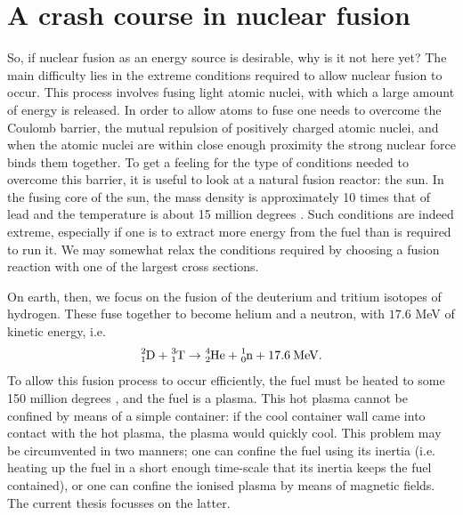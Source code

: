 \vspace*{-2mm}
\section{A crash course in nuclear fusion}
\label{sec: chap1 motivation}

So, if nuclear fusion as an energy source is desirable, why is it not here yet? The main difficulty lies in the extreme conditions required to allow nuclear fusion to occur. This process involves fusing light atomic nuclei, with which a large amount of energy is released. In order to allow atoms to fuse one needs to overcome the Coulomb barrier, the mutual repulsion of positively charged atomic nuclei, and when the atomic nuclei are within close enough proximity the strong nuclear force binds them together. To get a feeling for the type of conditions needed to overcome this barrier, it is useful to look at a natural fusion reactor: the sun. In the fusing core of the sun, the mass density is approximately 10 times that of lead and the temperature is about 15 million degrees \textcelsius. Such conditions are indeed extreme, especially if one is to extract more energy from the fuel than is required to run it. We may somewhat relax the conditions required by choosing a fusion reaction with one of the largest cross sections. \par 

On earth, then, we focus on the fusion of the deuterium and tritium isotopes of hydrogen. These fuse together to become helium and a neutron, with $17.6$ MeV of kinetic energy, i.e.
\begin{equation*}
    \ce{^{2}_{1} D} + \ce{^{3}_{1} T} \rightarrow \ce{^{4}_{2} He} + \ce{^{1}_{0} n} + 17.6 \: \mathrm{MeV}. 
\end{equation*}
To allow this fusion process to occur efficiently, the fuel must be heated to some 150 million degrees \textcelsius, and the fuel is a plasma. This hot plasma cannot be confined by means of a simple container: if the cool container wall came into contact with the hot plasma, the plasma would quickly cool. This problem may be circumvented in two manners; one can confine the fuel using its inertia (i.e. heating up the fuel in a short enough time-scale that its inertia keeps the fuel contained), or one can confine the ionised plasma by means of magnetic fields. The current thesis focusses on the latter. \par 

